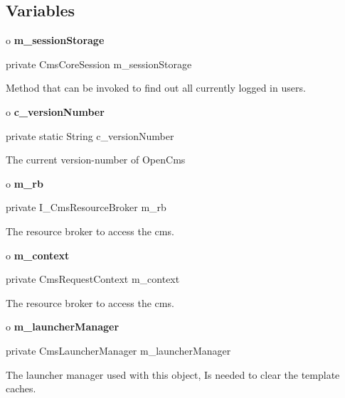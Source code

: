 \subsection*{  Variables }

o {\bf m\_sessionStorage} 

\begin{PRE}
 private CmsCoreSession m\_sessionStorage
\end{PRE}

\begin{description}
\htmlDD Method that can be invoked to find out all currently logged in users.

\end{description}

o {\bf c\_versionNumber} 

\begin{PRE}
 private static String c\_versionNumber
\end{PRE}

\begin{description}
\htmlDD The current version-number of OpenCms

\end{description}

o {\bf m\_rb} 

\begin{PRE}
 private I\_CmsResourceBroker m\_rb
\end{PRE}

\begin{description}
\htmlDD The resource broker to access the cms.

\end{description}

o {\bf m\_context} 

\begin{PRE}
 private CmsRequestContext m\_context
\end{PRE}

\begin{description}
\htmlDD The resource broker to access the cms.

\end{description}

o {\bf m\_launcherManager} 

\begin{PRE}
 private CmsLauncherManager m\_launcherManager
\end{PRE}

\begin{description}
\htmlDD The launcher manager used with this object, Is needed to clear the
template caches.

\end{description}

